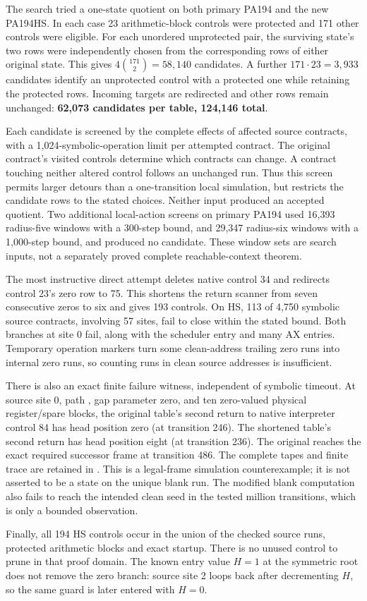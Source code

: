 The search tried a one-state quotient on both primary PA194 and the new
PA194HS. In each case 23 arithmetic-block controls were protected and
171 other controls were eligible. For each unordered unprotected pair,
the surviving state's two rows were independently chosen from the
corresponding rows of either original state. This gives
$4\binom{171}{2}=58,140$ candidates. A further $171\cdot23=3,933$
candidates identify an unprotected control with a protected one while
retaining the protected rows. Incoming targets are redirected and other
rows remain unchanged: \textbf{62,073 candidates per table, 124,146 total}.

Each candidate is screened by the complete effects of affected source
contracts, with a 1,024-symbolic-operation limit per attempted contract.
The original contract's visited controls determine which contracts can
change. A contract touching neither altered control follows an unchanged
run. Thus this screen permits larger detours than a one-transition local
simulation, but restricts the candidate rows to the stated choices.
Neither input produced an accepted quotient. Two additional local-action
screens on primary PA194 used 16,393 radius-five windows with a 300-step
bound, and 29,347 radius-six windows with a 1,000-step bound, and produced
no candidate. These window sets are search inputs, not a separately
proved complete reachable-context theorem.

The most instructive direct attempt deletes native control 34 and
redirects control 23's zero row to 75. This shortens the return scanner
from seven consecutive zeros to six and gives 193 controls. On HS,
113 of 4,750 symbolic source contracts, involving 57 sites, fail to
close within the stated bound. Both branches at site 0 fail, along with
the scheduler entry and many AX entries. Temporary operation markers
turn some clean-address trailing zero runs into internal zero runs, so
counting runs in clean source addresses is insufficient.

There is also an exact finite failure witness, independent of symbolic
timeout. At source site 0, path , gap parameter zero, and
ten zero-valued physical register/spare blocks, the original table's
second return to native interpreter control 84 has head position zero
(at transition 246). The shortened table's second return has head
position eight (at transition 236). The original reaches the exact
required successor frame at transition 486. The complete tapes and
finite trace are retained in
.
This is a legal-frame simulation counterexample; it is not asserted to
be a state on the unique blank run. The modified blank computation also
fails to reach the intended clean seed in the tested million transitions,
which is only a bounded observation.

Finally, all 194 HS controls occur in the union of the checked source
runs, protected arithmetic blocks and exact startup. There is no unused
control to prune in that proof domain. The known entry value $H=1$ at the
symmetric root does not remove the zero branch: source site 2 loops back
after decrementing $H$, so the same guard is later entered with $H=0$.
